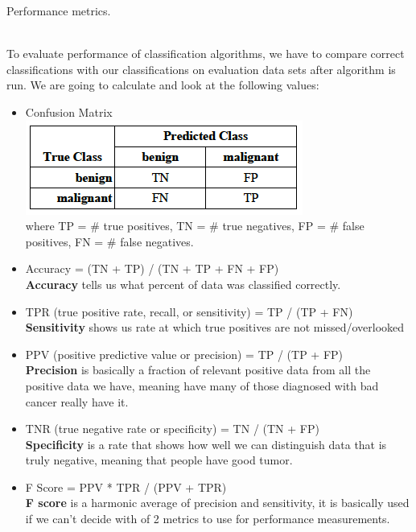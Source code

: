 \documentclass[12pt, letterpaper]{article}
\begin{document}
\begin{enumerate}[label=\Roman*.]
	{\bf \item Performance metrics.}\\
	
	To evaluate performance of  classification algorithms, we have to compare correct classifications with our classifications on evaluation data sets after algorithm is run. We are going to calculate and look at the following values: 
	\begin{itemize}
		\item Confusion Matrix \\
		
		\includegraphics[scale=0.7]{../images/1.png} \\
		where TP = \# true positives, TN = \# true negatives, FP = \# false positives, FN = \# false negatives.\\
		
		\item Accuracy = (TN + TP) / (TN + TP + FN + FP)\\
		{\bf Accuracy} tells us what percent of data was classified correctly. \\
		\item TPR (true positive rate, recall, or sensitivity) = TP / (TP + FN)\\
		{\bf Sensitivity} shows us rate at which true positives are not missed/overlooked \\
		\item PPV (positive predictive value or precision) = TP / (TP + FP)\\
		{\bf Precision} is basically a fraction of relevant positive data from all the positive data we have, meaning have many of those diagnosed with bad cancer really have it. \\ 
		\item TNR (true negative rate or specificity) = TN / (TN + FP)\\
		{\bf Specificity} is a rate that shows how well we can distinguish data that is truly negative, meaning that people have good tumor.\\
		\item F Score = PPV * TPR / (PPV + TPR)\\
		{\bf F score} is a harmonic average of precision and sensitivity, it is basically used if we can't decide with of 2 metrics to use for performance measurements. \\
	\end{itemize}
	

\end{enumerate}
\end{document}
